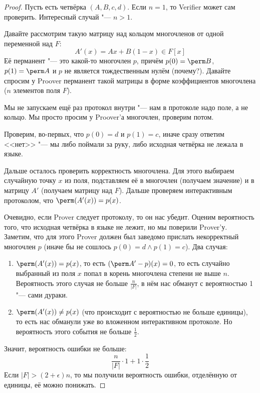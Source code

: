 	\begin{proof}
		Пусть есть четвёрка $(A, B, c, d)$.
		Если $n=1$, то Verifier может сам проверить.
		Интересный случай "--- $n>1$.

		Давайте рассмотрим такую матрицу над кольцом многочленов от одной переменной над $F$:
		\[ A'(x) = Ax + B(1-x) \in F[x] \]
		Её перманент "--- это какой-то многочлен $p$, причём $p(0)=\perm B$, $p(1)=\perm A$ и $p$ не является тождественным нулём (\TODO почему?).
		Давайте спросим у Proover перманент такой матрицы в форме коэффициентов многочлена ($n$ элементов поля $F$).
		\begin{Rem}
			Мы не запускаем ещё раз протокол внутри "--- нам в протоколе надо поле, а не кольцо.
			Мы просто просим у Proover'а многочлен, проверим потом.
		\end{Rem}
		Проверим, во-первых, что $p(0)=d$ и $p(1)=c$, иначе сразу ответим <<нет>> "--- мы либо поймали за руку, либо исходная четвёрка не лежала в языке.

		Дальше осталось проверить корректность многочлена.
		Для этого выбираем случайную точку $x$ из поля, подставляем её в многочлен (получаем значение) и в матрицу $A'$ (получаем матрицу над $F$).
		Дальше проверяем интерактивным протоколом, что $\perm (A'(x)) = p(x)$.

		Очевидно, если Prover следует протоколу, то он нас убедит.
		Оценим вероятность того, что исходная четвёрка в языке не лежит, но мы поверили Prover'у.
		Заметим, что для этого Prover должен был заведомо прислать некорректный многочлен $p$ (иначе бы не сошлось $p(0)=d \land p(1)=c$).
		Два случая:
		\begin{enumerate}
			\item
				$\perm (A'(x)) = p(x)$, то есть $(\perm A' - p)(x) = 0$, то есть случайно выбранный из поля $x$ попал в корень многочлена степени не выше $n$.
				Вероятность этого случая не больше $\frac{n}{|F|}$, в нём нас обманут с вероятностью 1 "--- сами дураки.
			\item
				$\perm (A'(x)) \neq p(x)$ (что происходит с вероятностью не больше единицы), то есть нас обманули уже во вложенном интерактивном протоколе.
				Но вероятность этого события не больше $\frac 12$.
		\end{enumerate}
		Значит, вероятность ошибки не больше:
		\[ \frac{n}{|F|} \cdot 1 + 1 \cdot \frac 12 \]
		Если $|F| > (2+\epsilon)n$, то мы получили вероятность ошибки, отделённую от единицы, её можно понижать.
	\end{proof}

